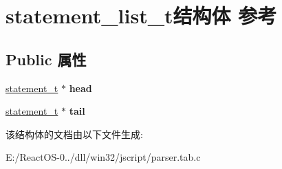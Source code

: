 \hypertarget{structstatement__list__t}{}\section{statement\+\_\+list\+\_\+t结构体 参考}
\label{structstatement__list__t}
\subsection*{Public 属性}
\begin{DoxyCompactItemize}
\item 
\mbox{\label{structstatement__list__t_a09834e07238d28ba0abedbf423508eea}} 
\hyperlink{struct__statement__t}{statement\+\_\+t} $\ast$ {\bfseries head}
\item 
\mbox{\label{structstatement__list__t_aac234eeb8d2904c643d588ac9a77a7c9}} 
\hyperlink{struct__statement__t}{statement\+\_\+t} $\ast$ {\bfseries tail}
\end{DoxyCompactItemize}


该结构体的文档由以下文件生成\+:\begin{DoxyCompactItemize}
\item 
E\+:/\+React\+O\+S-\/0../dll/win32/jscript/parser.\+tab.\+c\end{DoxyCompactItemize}
